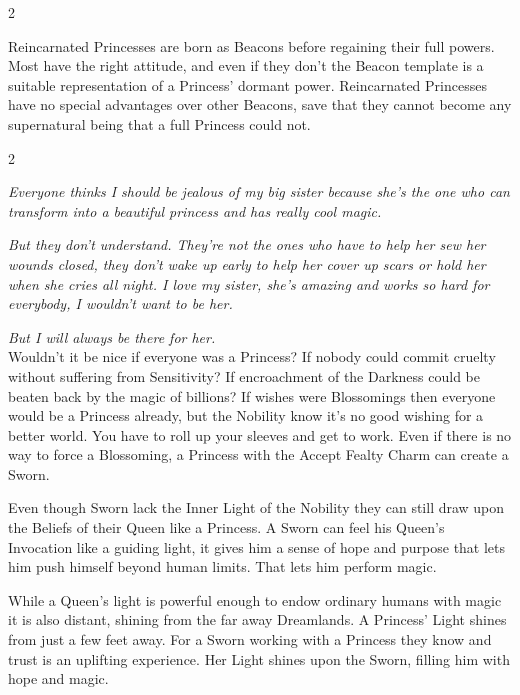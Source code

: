 \begin{multicols}{2}
\begin{mybox}
Reincarnated Princesses are born as Beacons before regaining their full powers. Most have the right attitude, and even if they don't the Beacon template is a suitable representation of a Princess' dormant power. Reincarnated Princesses have no special advantages over other Beacons, save that they cannot become any supernatural being that a full Princess could not.

\end{mybox}

\end{multicols}\label{scha:Sworn}\begin{multicols}{2}\raggedcolumns

\noindent \textit{Everyone thinks I should be jealous of my big sister because she's the one who can transform into a beautiful princess and has really cool magic.}

\textit{But they don't understand. They're not the ones who have to help her sew her wounds closed, they don't wake up early to help her cover up scars or hold her when she cries all night. I love my sister, she's amazing and works so hard for everybody, I wouldn't want to be her.}

\textit{But I will always be there for her.}\\

\noindent Wouldn’t it be nice if everyone was a Princess? If nobody could commit cruelty without suffering from Sensitivity? If encroachment of the Darkness could be beaten back by the magic of billions? If wishes were Blossomings then everyone would be a Princess already, but the Nobility know it’s no good wishing for a better world. You have to roll up your sleeves and get to work. Even if there is no way to force a Blossoming, a Princess with the Accept Fealty Charm can create a Sworn.

Even though Sworn lack the Inner Light of the Nobility they can still draw upon the Beliefs of their Queen like a Princess. A Sworn can feel his Queen's Invocation like a guiding light, it gives him a sense of hope and purpose that lets him push himself beyond human limits. That lets him perform magic. 

While a Queen's light is powerful enough to endow ordinary humans with magic it is also distant, shining from the far away Dreamlands. A Princess' Light shines from just a few feet away. For a Sworn working with a Princess they know and trust is an uplifting experience. Her Light shines upon the Sworn, filling him with hope and magic.


\end{multicols}
